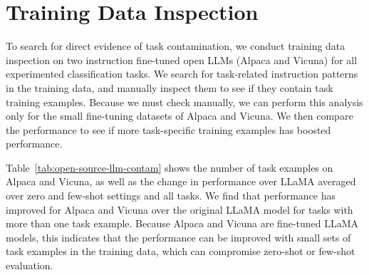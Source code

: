 \documentclass[letterpaper]{article} %
\newcommand{\nilay}[1]{}
\begin{document}
\section{Training Data Inspection}
\label{sec:trainingdatainspection}
To search for direct evidence of task contamination, we conduct training data inspection on two instruction fine-tuned open LLMs (Alpaca and Vicuna) for all experimented classification tasks. We search for task-related instruction patterns in the training data, and manually inspect them to see if they contain task training examples. Because we must check manually, we can perform this analysis only for the small fine-tuning datasets of Alpaca and Vicuna. We then compare the performance to see if more task-specific training examples has boosted performance.

Table~\ref{tab:open-source-llm-contam} shows the number of task examples on Alpaca and Vicuna, as well as the change in performance over LLaMA averaged over zero and few-shot settings and all tasks.  We find that performance has improved for Alpaca and Vicuna over the original LLaMA model for tasks with more than one task example. Because Alpaca and Vicuna are fine-tuned LLaMA models, this indicates that the performance can be improved with small sets of task examples in the training data, which can compromise zero-shot or few-shot evaluation. \nilay{This could also be the effect of instruction tuning. If possible, can we maybe re-train alpaca minus the examples you extracted and see how it does? If it's significantly worse, that is very strong evidence for task contamination. I think training alpaca is feasible in a couple days on Nautilus, and is easy to run since code is provided. Maybe could try Alpaca-LoRA if it's too heavy.}
\end{document}
